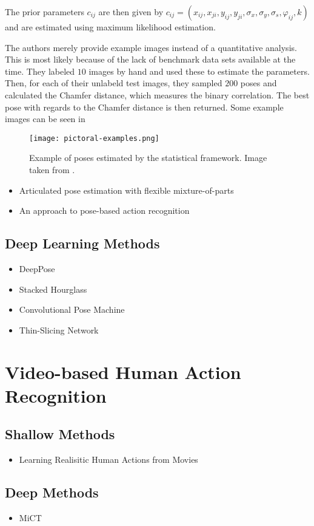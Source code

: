 The prior parameters $c_{ij}$ are then given by $c_{ij} = (x_{ij}, x_{ji}, y_{ij}, y_{ji}, \sigma_x, \sigma_y, \sigma_s, \varphi_{ij}, k)$ and are estimated using maximum likelihood estimation.

The authors merely provide example images instead of a quantitative analysis.
This is most likely because of the lack of benchmark data sets available at the time.
They labeled $10$ images by hand and used these to estimate the parameters.
Then, for each of their unlabeld test images, they sampled $200$ poses and calculated the Chamfer distance, which measures the binary correlation.
The best pose with regards to the Chamfer distance is then returned.
Some example images can be seen in 

\begin{figure}[htb!]
    \centering
    \texttt{[image: pictoral-examples.png]}
    \caption{Example of poses estimated by the statistical framework. Image taken from \cite{felzenszwalb_pictorial_2005}.}
    \label{fig:pictoral-examples}
\end{figure}

\begin{itemize}
    \item Articulated pose estimation with flexible mixture-of-parts \cite{yang_articulated_2011}
    \item An approach to pose-based action recognition \cite{wang_approach_2013}
\end{itemize}

\subsection{Deep Learning Methods}
\begin{itemize}
    \item DeepPose \cite{toshev_deeppose:_2014}
    \item Stacked Hourglass \cite{newell_stacked_2016}
    \item Convolutional Pose Machine \cite{wei_convolutional_2016}
    \item Thin-Slicing Network \cite{song_thin-slicing_2017}
\end{itemize}

\section{Video-based Human Action Recognition}
\subsection{Shallow Methods}
\begin{itemize}
    \item Learning Realisitic Human Actions from Movies \cite{laptev_learning_2008}
\end{itemize}

\subsection{Deep Methods}
\begin{itemize}
    \item MiCT \cite{zhou_mict:_2018}
\end{itemize}